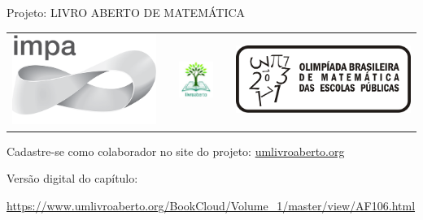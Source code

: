 \begin{center}
Projeto: LIVRO ABERTO DE MATEMÁTICA

\noindent \begin{tabular}{lcccr}
\includegraphics[scale=.15]{impa}& \quad\quad& \includegraphics[width=3cm]{logo} & \quad\quad& \includegraphics[scale=.24]{obmep} 
\end{tabular}
\end{center}

\vspace*{.3cm}

Cadastre-se como colaborador no site do projeto: \url{umlivroaberto.org}

Versão digital do capítulo:

\url{https://www.umlivroaberto.org/BookCloud/Volume_1/master/view/AF106.html}


